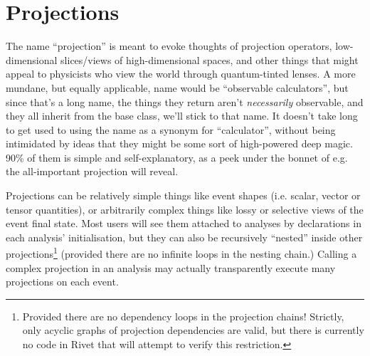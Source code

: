 \documentclass{JHEP3}
\begin{document}


\section{Projections}

The name ``projection'' is meant to evoke thoughts of projection operators,
low-dimensional slices/views of high-dimensional spaces, and other things that
might appeal to physicists who view the world through quantum-tinted lenses. A
more mundane, but equally applicable, name would be ``observable calculators'',
but since that's a long name, the things they return aren't \emph{necessarily}
observable, and they all inherit from the  base class, we'll
stick to that name. It doesn't take long to get used to using the name as a
synonym for ``calculator'', without being intimidated by ideas that they might
be some sort of high-powered deep magic. 90\% of them is simple and
self-explanatory, as a peek under the bonnet of e.g. the all-important
 projection will reveal.

Projections can be relatively simple things like event shapes (i.e. scalar,
vector or tensor quantities), or arbitrarily complex things like lossy or
selective views of the event final state. Most users will see them attached to
analyses by declarations in each analysis' initialisation, but they can also be
recursively ``nested'' inside other projections\footnote{Provided there are no
  dependency loops in the projection chains! Strictly, only acyclic graphs of
  projection dependencies are valid, but there is currently no code in Rivet
  that will attempt to verify this restriction.} (provided there are no infinite
loops in the nesting chain.) Calling a complex projection in an analysis may
actually transparently execute many projections on each event.
\end{document}
